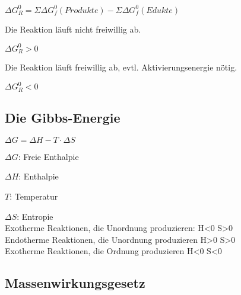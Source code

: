 	\large{
		$\Delta G^0_R = \Sigma \Delta G^0_f (Produkte) - \Sigma \Delta G^0_f (Edukte)$
	}
	
\begin{definition}
	Die Reaktion läuft nicht freiwillig ab.
	
	$\Delta G^0_R > 0$
\end{definition}

\begin{definition}
	Die Reaktion läuft freiwillig ab, evtl. Aktivierungsenergie nötig.
	
	$\Delta G^0_R < 0$
\end{definition}

\subsection{Die Gibbs-Energie}

\large{
	$\Delta G = \Delta H - T\cdot \Delta S$
}
	
	$\Delta G$: Freie Enthalpie
	
	$\Delta H$: Enthalpie
	
	$T$: Temperatur
	
	$\Delta S$: Entropie \\

	Exotherme Reaktionen, die Unordnung produzieren:   H\textless0 S\textgreater0    \\
	
	Endotherme Reaktionen, die Unordnung produzieren  H\textgreater0 S\textgreater0 \\
	
	Exotherme Reaktionen, die Ordnung produzieren     H\textless0 S\textless0      

\subsection{Massenwirkungsgesetz}







